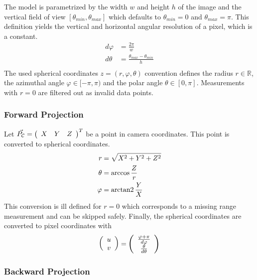The model is parametrized by the width $w$ and height $h$ of the image and the vertical field of view $[\theta_{min}, \theta_{max}]$ which defaults to $\theta_{min} = 0$ and $\theta_{max} = \pi$.
This definition yields the vertical and horizontal angular resolution of a pixel, which is a constant.
\begin{equation}
\label{eq:equi_angular_resolution}
\begin{aligned}
    d\varphi &= \frac{2 \pi}{w} \\
    d\theta &= \frac{\theta_{max} - \theta_{min}}{h} \\
\end{aligned}
\end{equation}
The used spherical coordinates $z = (r, \varphi, \theta)$ convention defines the radius $r \in \mathbb{R}$, the azimuthal angle $\varphi \in [-\pi, \pi)$ and the polar angle $\theta \in [0, \pi]$.
Measurements with $r = 0$ are filtered out as invalid data points.

\subsubsection*{Forward Projection}

Let $\vec{P_\mathcal{C}} = \left(\begin{array}{ccc} X & Y & Z \end{array}\right)^T$ be a point in camera coordinates.
This point is converted to spherical coordinates.
\begin{equation}
\begin{aligned}
    r       &= \sqrt{X^2 + Y^2 + Z^2} \\
    \theta  &= \arccos{\frac{Z}{r}} \\
    \varphi &= \operatorname{arctan2}{\frac{Y}{X}}
\end{aligned}
\end{equation}
This conversion is ill defined for $r = 0$ which corresponds to a missing range measurement and can be skipped safely.
Finally, the spherical coordinates are converted to pixel coordinates with
\begin{equation}
\begin{aligned} 
    \left(\begin{array}{c} u \\ v \end{array}\right) = \left(\begin{array}{c} \frac{\varphi + \pi}{d\varphi} \\ \frac{\theta}{d\theta} \end{array}\right)
\end{aligned}
\end{equation}

\subsubsection*{Backward Projection}

